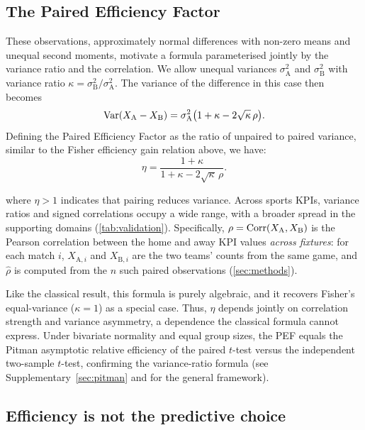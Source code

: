 \subsection{The Paired Efficiency Factor}
\label{sec:pef_def}

These observations, approximately normal differences with non-zero means and unequal second moments, motivate a formula parameterised jointly by the variance ratio and the correlation. We allow unequal variances $\sigma^{2}_{\mathrm{A}}$ and $\sigma^{2}_{\mathrm{B}}$ with variance ratio $\kappa=\sigma^{2}_{\mathrm{B}}/\sigma^{2}_{\mathrm{A}}$. The variance of the difference in this case then becomes
\begin{equation*}
  \operatorname{Var}(X_{\mathrm{A}} - X_{\mathrm{B}}) = \sigma^{2}_{\mathrm{A}}\bigl(1 + \kappa - 2\sqrt{\kappa}\,\rho\bigr).
\end{equation*}
Defining the Paired Efficiency Factor as the ratio of unpaired to paired variance, similar to the Fisher efficiency gain relation above, we have:
\begin{equation}
  \eta = \frac{1+\kappa}{1+\kappa-2\sqrt{\kappa}\,\rho}.
  \label{eq:pef}
\end{equation}

\noindent where $\eta>1$ indicates that pairing reduces variance. Across sports KPIs, variance ratios and signed correlations occupy a wide range, with a broader spread in the supporting domains (\cref{tab:validation}). Specifically, $\rho=\operatorname{Corr}(X_{\mathrm{A}},X_{\mathrm{B}})$ is the Pearson correlation between the home and away KPI values \emph{across fixtures}: for each match $i$, $X_{\mathrm{A},i}$ and $X_{\mathrm{B},i}$ are the two teams' counts from the same game, and $\hat\rho$ is computed from the $n$ such paired observations (\cref{sec:methods}).

Like the classical result, this formula is purely algebraic, and it recovers Fisher's equal-variance ($\kappa=1$) as a special case. Thus, $\eta$ depends jointly on correlation strength and variance asymmetry, a dependence the classical formula cannot express. Under bivariate normality and equal group sizes, the PEF equals the Pitman asymptotic relative efficiency of the paired $t$-test versus the independent two-sample $t$-test, confirming the variance-ratio formula (see Supplementary~\cref{sec:pitman} and \parencite{lehmann1999} for the general framework).

\subsection{Efficiency is not the predictive choice}

